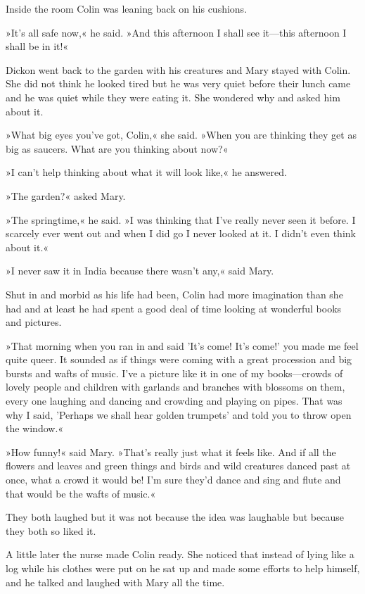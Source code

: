 Inside the room Colin was leaning back on his cushions.

»It's all safe now,« he said. »And this afternoon I shall see it—this afternoon I shall be in it!«

Dickon went back to the garden with his creatures and Mary stayed with Colin. She did not think he looked tired but he was very quiet before their lunch came and he was quiet while they were eating it. She wondered why and asked him about it.

»What big eyes you've got, Colin,« she said. »When you are thinking they get as big as saucers. What are you thinking about now?«

»I can't help thinking about what it will look like,« he answered.

»The garden?« asked Mary.

»The springtime,« he said. »I was thinking that I've really never seen it before. I scarcely ever went out and when I did go I never looked at it. I didn't even think about it.«

»I never saw it in India because there wasn't any,« said Mary.

Shut in and morbid as his life had been, Colin had more imagination than she had and at least he had spent a good deal of time looking at wonderful books and pictures.

»That morning when you ran in and said 'It's come! It's come!' you made me feel quite queer. It sounded as if things were coming with a great procession and big bursts and wafts of music. I've a picture like it in one of my books—crowds of lovely people and children with garlands and branches with blossoms on them, every one laughing and dancing and crowding and playing on pipes. That was why I said, 'Perhaps we shall hear golden trumpets' and told you to throw open the window.«

»How funny!« said Mary. »That's really just what it feels like. And if all the flowers and leaves and green things and birds and wild creatures danced past at once, what a crowd it would be! I'm sure they'd dance and sing and flute and that would be the wafts of music.«

They both laughed but it was not because the idea was laughable but because they both so liked it.

A little later the nurse made Colin ready. She noticed that instead of lying like a log while his clothes were put on he sat up and made some efforts to help himself, and he talked and laughed with Mary all the time.

